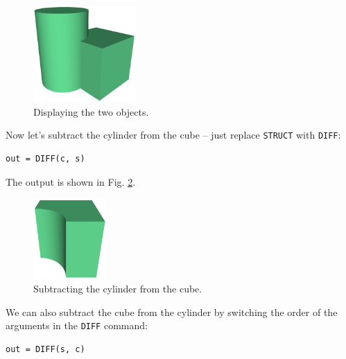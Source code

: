 \begin{figure}[!ht]
\begin{center}
\includegraphics[width=0.35\textwidth]{img/diff-0.png}
\end{center}
\vspace{-4mm}
\caption{Displaying the two objects.}
\label{fig:diff-0}
\end{figure}
\noindent
Now let's subtract the cylinder from the cube -- just replace 
{\tt STRUCT} with {\tt DIFF}:\\

\begin{bbox}
\begin{verbatim}
out = DIFF(c, s) 
\end{verbatim}
\end{bbox}
\vspace{6mm}

\noindent
The output is shown in Fig. \ref{fig:diff-1}.

\begin{figure}[!ht]
\begin{center}
\includegraphics[width=0.25\textwidth]{img/diff-1.png}
\end{center}
\vspace{-4mm}
\caption{Subtracting the cylinder from the cube.}
\label{fig:diff-1}
\end{figure}
\noindent
We can also subtract the cube from the cylinder by switching 
the order of the arguments in the {\tt DIFF} command:\\

\begin{bbox}
\begin{verbatim}
out = DIFF(s, c) 
\end{verbatim}
\end{bbox}
\vspace{6mm}

